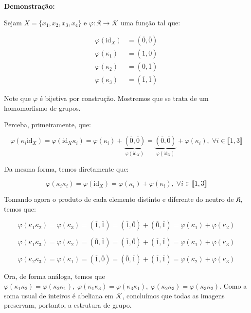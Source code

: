 \documentclass[16pt,openany]{book}
\theoremstyle{definition}
\begin{document}
\textbf{Demonstração:}

Sejam $X = \{x_1,x_2,x_3,x_4\}$ e $\varphi : \mathfrak{K} \to \mathcal{K}$ uma função tal que:

\begin{align*}
\varphi(\text{id}_X) &= (\overline{0},\overline{0}) \\
\varphi(\kappa_1) &= (\overline{1},\overline{0}) \\
\varphi(\kappa_2) &= (\overline{0},\overline{1}) \\
\varphi(\kappa_3) &= (\overline{1},\overline{1})
\end{align*}

Note que $\varphi$ é bijetiva por construção. Mostremos que se trata de um homomorfismo de grupos.

Perceba, primeiramente, que: 

\[
\varphi(\kappa_i\text{id}_X) = \varphi(\text{id}_X\kappa_i) = \varphi(\kappa_i) + \underbrace{(\overline{0},\overline{0})}_{\varphi(\text{id}_X)} = \underbrace{(\overline{0},\overline{0})}_{\varphi(\text{id}_X)} + \varphi(\kappa_i),\;\forall i\in\llbracket 1,3\rrbracket
\]

Da mesma forma, temos diretamente que:

\[
\varphi(\kappa_i\kappa_i) = \varphi(\text{id}_X) = \varphi(\kappa_i) + \varphi(\kappa_i),\;\forall i\in\llbracket 1,3\rrbracket 
\]

Tomando agora o produto de cada elemento distinto e diferente do neutro de $\mathfrak{K}$, temos que:

\[
\varphi(\kappa_1\kappa_2) = \varphi(\kappa_3) = (\overline{1},\overline{1}) = (\overline{1},\overline{0}) + (\overline{0},\overline{1}) = \varphi(\kappa_1) + \varphi(\kappa_2)
\]

\[
\varphi(\kappa_1\kappa_3) = \varphi(\kappa_2) = (\overline{0},\overline{1}) = (\overline{1},\overline{0})+(\overline{1},\overline{1}) = \varphi(\kappa_1) + \varphi(\kappa_3)
\]

\[
\varphi(\kappa_2\kappa_3) = \varphi(\kappa_1) = (\overline{1},\overline{0}) = (\overline{0},\overline{1})+(\overline{1},\overline{1}) = \varphi(\kappa_2) + \varphi(\kappa_3)
\]

Ora, de forma análoga, temos que $\varphi(\kappa_1\kappa_2) = \varphi(\kappa_2\kappa_1),\;\varphi(\kappa_1\kappa_3)=\varphi(\kappa_3\kappa_1),\;\varphi(\kappa_2\kappa_3)=\varphi(\kappa_3\kappa_2)$. Como a soma usual de inteiros é abeliana em $\mathcal{K}$, concluímos que todas as imagens preservam, portanto, a estrutura de grupo.
\end{document}
